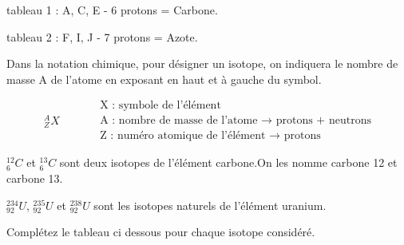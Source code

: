 \documentclass[
  11pt,
  a4paper,
  openany]{book}
\begin{document}
\begin{Answer}

tableau 1 : A, C, E - 6 protons = Carbone.

tableau 2 : F, I, J - 7 protons = Azote.

\newpage

\end{Answer}

Dans la notation chimique, pour désigner un isotope, on indiquera le nombre de masse A de l'atome en exposant en haut et à gauche du symbol.

\[ \begin{split}
  _{Z}^{A}X
  \end{split}
  \qquad
  \begin{split}
  & \text{X : symbole de l'élément} \\
    & \text{A : nombre de masse de l'atome $\rightarrow$ protons + neutrons} \\
    & \text{Z : numéro atomique de l'élément $\rightarrow$ protons}
  \end{split} \]

\(_{6}^{12}C\) et \(_{6}^{13}C\) sont deux isotopes de l'élément carbone.On les nomme carbone 12 et carbone 13.

\(_{92}^{234}U\), \(_{92}^{235}U\) et \(_{92}^{238}U\) sont les isotopes naturels de l'élément uranium.

\begin{Exercise}
Complétez le tableau ci dessous pour chaque isotope considéré.

\end{Exercise}
\end{document}
